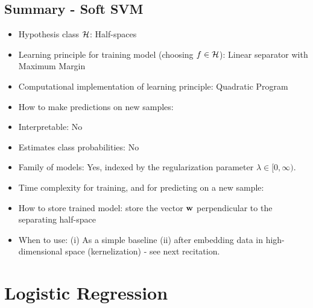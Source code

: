 \subsection{Summary - Soft SVM}
\begin{itemize}
     \item Hypothesis class $\mathcal{H}$: Half-spaces
     \item Learning principle for training model (choosing $f\in\mathcal{H}$): Linear separator with Maximum Margin
    \item Computational implementation of learning principle: Quadratic Program
  \item How to make predictions on new samples:       
  \item Interpretable: No
    \item Estimates class probabilities: No
  \item Family of models: Yes, indexed by the regularization parameter
    $\lambda\in[0,\infty)$.
     \item Time complexity for training, and for predicting on a new sample:
  \item How to store trained model: store the vector $\mathbf{w}$ perpendicular to
    the separating half-space  
  \item When to use: (i) As a simple baseline (ii) after embedding data in
    high-dimensional space (kernelization) - see next recitation. 
\end{itemize}


\section{Logistic Regression}
